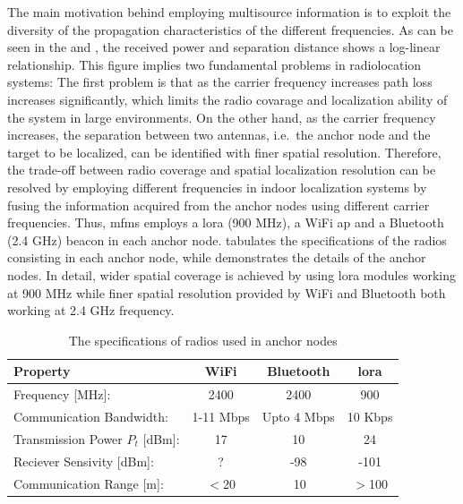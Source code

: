     The main motivation behind employing multisource information is to exploit the diversity of the propagation characteristics of the different frequencies.
    As can be seen in the  and , the received power and separation distance shows a log-linear relationship.
    This figure implies two fundamental problems in radiolocation systems:
    The first problem is that as the carrier frequency increases path loss increases significantly, which limits the radio covarage and localization ability of the system in large environments.
    On the other hand, as the carrier frequency increases, the separation between two antennas, i.e.\ the anchor node and the target to be localized, can be identified with finer spatial resolution.
    Therefore, the trade-off between radio coverage and spatial localization resolution can be resolved by employing different frequencies in indoor localization systems by fusing the information acquired from the anchor nodes using different carrier frequencies.
    Thus, \gls{mfms} employs a \gls{lora} (900 MHz), a WiFi \gls{ap} and a Bluetooth (2.4 GHz) beacon in each anchor node.
     tabulates the specifications of the radios consisting in each anchor node, while  demonstrates the details of the anchor nodes.
    In detail, wider spatial coverage is achieved by using \gls{lora} modules working at 900 MHz while finer spatial resolution provided by WiFi and Bluetooth both working at 2.4 GHz frequency.

    \begin{table}
    \begin{center}
    \caption{\label{tab:specs}The specifications of radios used in anchor nodes}
      \begin{tabular}{@{}lccc@{}}\toprule[1.5pt]
        Property                        &WiFi           &Bluetooth      &\gls{lora}\\ \midrule[1.5pt]
        Frequency [MHz]:                &2400           &2400           &900 \\ \midrule
        Communication Bandwidth:        &1-11 Mbps      &Upto 4 Mbps    &10 Kbps \\ \midrule
        Transmission Power $P_t$ [dBm]: &17             &10             &24 \\ \midrule
        Reciever Sensivity [dBm]:       &?              &-98            &-101 \\ \midrule
        Communication Range [m]:        &$<$20          &$~$10            &$>$100  \\\bottomrule[1.5pt]
      \end{tabular}
    \end{center}
    \end{table}

